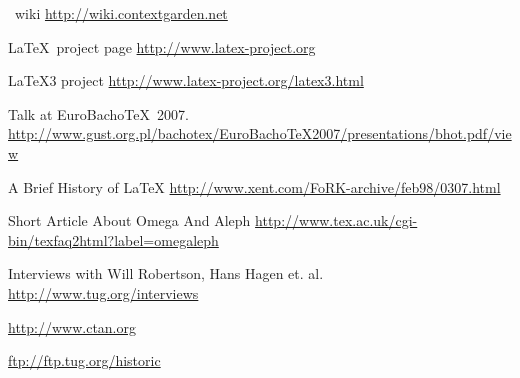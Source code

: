 \documentclass{scrartcl}
\begin{document}
\begin{thebibliography}{10}
\vspace{2ex}
\vspace{1ex}
\ConTeXt\ wiki
\newblock \url{http://wiki.contextgarden.net}

{\LaTeX\ project page}
\newblock \url{http://www.latex-project.org}

{\LaTeX3 project}
\newblock \url{http://www.latex-project.org/latex3.html}

\vspace{2ex}
\vspace{1ex}
\newblock Talk at EuroBacho\TeX\ 2007.\\
\newblock \url{http://www.gust.org.pl/bachotex/EuroBachoTeX2007/presentations/bhot.pdf/view}

{A Brief History of \LaTeX}
\newblock \url{http://www.xent.com/FoRK-archive/feb98/0307.html}

{Short Article About Omega And Aleph}
\newblock \url{http://www.tex.ac.uk/cgi-bin/texfaq2html?label=omegaleph}

{Interviews with Will Robertson, Hans Hagen et. al.}
\newblock \url{http://www.tug.org/interviews}

\vspace{2ex}
\vspace{1ex}

\newblock \url{http://www.ctan.org}

\newblock \url{ftp://ftp.tug.org/historic}
\end{thebibliography}

\label{sec:text}
\end{document}

